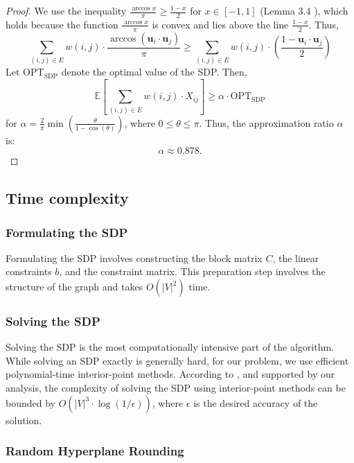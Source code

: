 \begin{proof}
    We use the inequality \( \frac{\arccos x}{\pi} \geq \frac{1 - x}{2} \) for \( x \in [-1, 1] \) (Lemma 3.4 \cite{goemans1995improved}), which holds because the function \( \frac{\arccos x}{\pi} \) is convex and lies above the line \( \frac{1 - x}{2} \). Thus,
    \[
    \sum_{(i, j) \in E} w(i, j) \cdot \frac{\arccos(\mathbf{u}_i \cdot \mathbf{u}_j)}{\pi} \geq \sum_{(i, j) \in E} w(i, j) \cdot \left( \frac{1 - \mathbf{u}_i \cdot \mathbf{u}_j}{2} \right)
    \]
    Let \( \mathrm{OPT_{SDP}} \) denote the optimal value of the SDP. Then,
    \[
    \mathbb{E}\left[\sum_{(i, j) \in E} w(i, j) \cdot X_{ij}\right] \geq \alpha \cdot \mathrm{OPT_{SDP}}
    \]
    for \( \alpha = \frac{2}{\pi} \min \left( \frac{\theta}{1 - \cos(\theta)} \right) \), where \( 0 \leq \theta \leq \pi \). Thus, the approximation ratio \( \alpha \) is:
    \[
    \alpha \approx 0.878.
    \]
\end{proof}



\subsection{Time complexity}

\subsubsection{Formulating the SDP}

Formulating the SDP involves constructing the block matrix \(C\), the linear constraints \(b\), and the constraint matrix. This preparation step involves the structure of the graph and takes \(O(|V|^2)\) time.

\subsubsection{Solving the SDP}

Solving the SDP is the most computationally intensive part of the algorithm. While solving an SDP exactly is generally hard, for our problem, we use efficient polynomial-time interior-point methods. According to \cite{golub1983matrix}, and supported by our analysis, the complexity of solving the SDP using interior-point methods can be bounded by \(O(|V|^3 \cdot \log(1/\epsilon))\), where \(\epsilon\) is the desired accuracy of the solution.


\subsubsection{Random Hyperplane Rounding}

